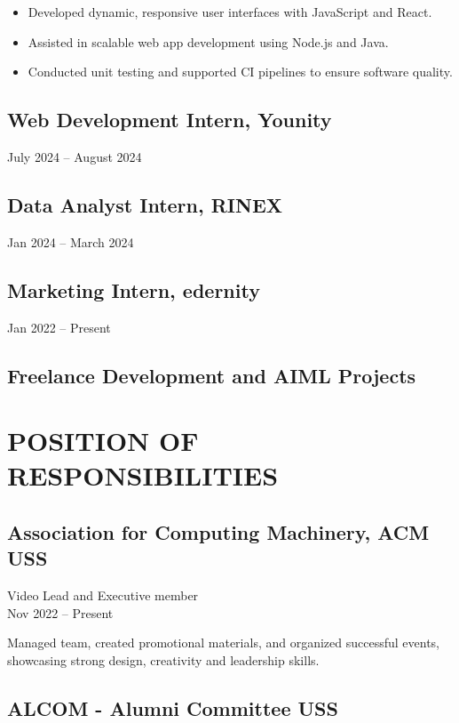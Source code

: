 \documentclass{article}
\begin{document}
\begin{itemize}[leftmargin=*]
    \item Developed dynamic, responsive user interfaces with JavaScript and React.
    \item Assisted in scalable web app development using Node.js and Java.
    \item Conducted unit testing and supported CI pipelines to ensure software quality.
\end{itemize}

\subsection*{Web Development Intern, Younity}

July 2024 -- August 2024

\subsection*{Data Analyst Intern, RINEX}

Jan 2024 -- March 2024

\subsection*{Marketing Intern, edernity}

Jan 2022 -- Present

\subsection*{Freelance Development and AIML Projects}

\section*{POSITION OF RESPONSIBILITIES}

\subsection*{Association for Computing Machinery, ACM USS}

Video Lead and Executive member \\
Nov 2022 -- Present

Managed team, created promotional materials, and organized successful events, showcasing strong design, creativity and leadership skills.

\subsection*{ALCOM - Alumni Committee USS}
\end{document}
